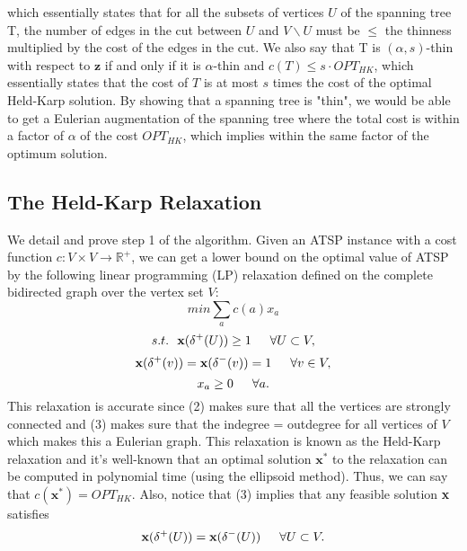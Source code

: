 \documentclass[oneside]{projectpaper} %
\begin{document}
which essentially states that for all the subsets of vertices $U$ of the spanning tree T, the number of edges in the cut between $U$ and $V \backslash U$ must be $\leq$ the thinness multiplied by the cost of the edges in the cut. \newline
\indent We also say that T is $(\alpha, s)$-thin with respect to $\textbf{z}$ if and only if it is $\alpha$-thin and $c(T) \leq s \cdot OPT_{HK}$, which essentially states that the cost of $T$ is at most $s$ times the cost of the optimal Held-Karp solution.
\indent By showing that a spanning tree is "thin", we would be able to get a Eulerian augmentation of the spanning tree where the total cost is within a factor of $\alpha$ of the cost $OPT_{HK}$, which implies within the same factor of the optimum solution.

\subsection{The Held-Karp Relaxation}
We detail and prove step 1 of the algorithm. Given an ATSP instance with a cost function $c : V \times V \rightarrow \mathbb{R}^+$, we can get a lower bound on the optimal value of ATSP by the following linear programming (LP) relaxation defined on the complete bidirected graph over the vertex set $V$:
\begin{equation}
  min \sum\limits_{a}c(a)x_a
\end{equation}
\begin{equation}
  s.t. \ \ \textbf{x}(\delta^{+}(U)) \geq 1 \indent \forall U \subset V,
\end{equation}
\begin{equation}
  \textbf{x}(\delta^{+}(v)) = \textbf{x}(\delta^{-}(v)) = 1 \indent \forall v \in V,
\end{equation}
\begin{equation*}
  x_a \geq 0 \indent \forall a.
\end{equation*}
This relaxation is accurate since (2) makes sure that all the vertices are strongly connected and (3) makes sure that the indegree = outdegree for all vertices of $V$ which makes this a Eulerian graph. This relaxation is known as the Held-Karp relaxation \cite{HK70} and it's well-known that an optimal solution $\textbf{x}^*$ to the relaxation can be computed in polynomial time (using the ellipsoid method). Thus, we can say that $c(\textbf{x}^*) = OPT_{HK}$. Also, notice that (3) implies that any feasible solution \textbf{x} satisfies
\begin{equation}
  \textbf{x}(\delta^{+}(U)) =   \textbf{x}(\delta^{-}(U)) \indent \forall U \subset V.
\end{equation}
\end{document}

